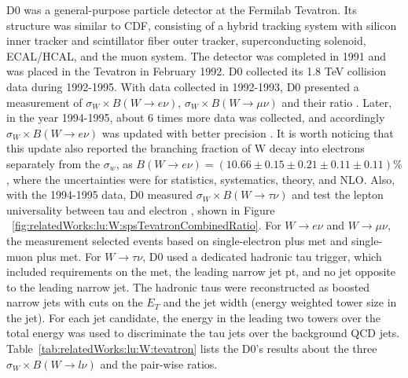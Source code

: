 D0 was a general-purpose particle detector at the Fermilab Tevatron. Its structure was similar to CDF, consisting of a hybrid tracking system with silicon inner tracker and scintillator fiber outer tracker, superconducting solenoid, ECAL/HCAL, and the muon system. The detector was completed in 1991 and was placed in the Tevatron in February 1992. D0 collected its 1.8 TeV collision data during 1992-1995. With data collected in 1992-1993, D0 presented a measurement of $\sigma_W \times B(W\to e\nu)$, $\sigma_W \times B(W\to \mu \nu)$ and their ratio \cite{Abachi:1995xc}. Later, in the year 1994-1995, about 6 times more data was collected, and accordingly $\sigma_W \times B(W\to e\nu)$ was updated with better precision \cite{Abbott:1999tt}. It is worth noticing that this update \cite{Abbott:1999tt} also reported the branching fraction of W decay into electrons separately from the $\sigma_w$, as $B(W\to e\nu)=(10.66\pm0.15\pm0.21\pm0.11\pm0.11)\%$, where the uncertainties were for statistics, systematics, theory, and NLO. Also, with the 1994-1995 data, D0 measured $\sigma_W \times B(W\to \tau \nu)$ and test the lepton universality between tau and electron \cite{Abbott:1999pk}, shown in Figure ~\ref{fig:relatedWorks:lu:W:spsTevatronCombinedRatio}. For $W \to e \nu$ and $W \to \mu \nu$, the measurement selected events based on single-electron plus met and single-muon plus met. For $W \to \tau \nu$, D0 used a dedicated hadronic tau trigger, which included requirements on the met, the leading narrow jet pt, and no jet opposite to the leading narrow jet. The hadronic taus were reconstructed as boosted narrow jets with cuts on the $E_T$ and the jet width (energy weighted tower size in the jet). For each jet candidate, the energy in the leading two towers over the total energy was used to discriminate the tau jets over the background QCD jets. Table~\ref{tab:relatedWorks:lu:W:tevatron} lists the D0's results about the three $\sigma_W \times B(W\to l \nu)$ and the pair-wise ratios.











